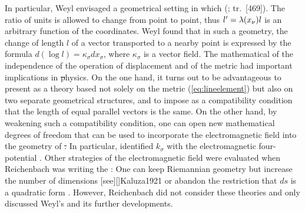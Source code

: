\documentclass[final]{article}
\renewcommand{\rzlap}[2]{(\cite[#1]{Reichenbach1928}; tr.\ [#2])\xspace}
\begin{document}
In particular, Weyl envisaged a geometrical setting in which  \rzlap{336}{469}. The ratio of units is allowed to change from point to point, thus $l'=\lambda(x_{\nu})l$ is an arbitrary function of the coordinates. Weyl found that in such a geometry, the change of length $l$ of a vector transported to a nearby point is expressed by the formula $d (\log l)=\kappa_\sigma dx_\sigma$, where $\kappa_\sigma$ is a vector field. The mathematical  of the independence of the operation of displacement and of the metric had important implications in \st physics. On the one hand, it turns out to be advantageous to present \gr as a theory based not solely on the metric (\cref{eq:lineelement}) but also on two separate geometrical structures, and to impose as a compatibility condition that the length of equal parallel vectors is the same. On the other hand, by weakening such a compatibility condition, one can open new mathematical degrees of freedom that can be used to incorporate the electromagnetic field into the geometry of \st. In particular, \citet{Weyl1918a} identified $k_\sigma$ with the electromagnetic four-potential . Other strategies of  the electromagnetic field were evaluated when Reichenbach was writing the \Ap: One can keep Riemannian geometry but increase the number of dimensions [see][]{Kaluza1921} or abandon the restriction that $ds$ is a quadratic form \citep{Reichenbaecher1925}. However, Reichenbach did not consider these theories and only discussed Weyl's  and its further developments.
\end{document}

